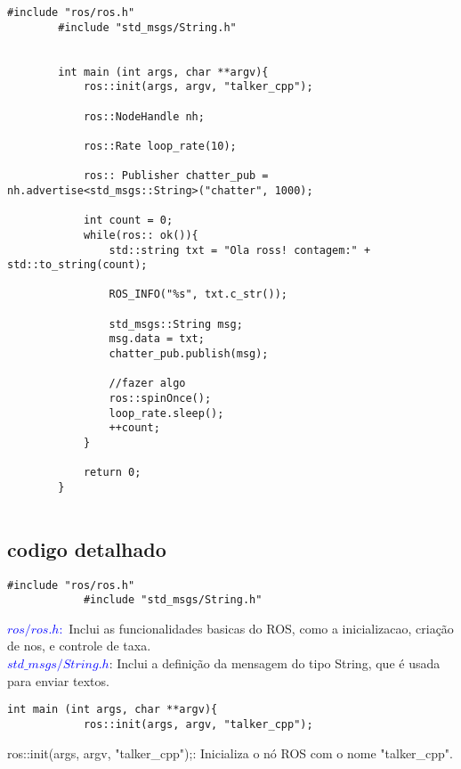 \documentclass[letterpaper]{article}
\begin{document}
    \begin{lstlisting}[style=cppStyle, title= talker\_cpp.cpp ] 
        #include "ros/ros.h"
        #include "std_msgs/String.h"
        
        
        int main (int args, char **argv){
            ros::init(args, argv, "talker_cpp");
        
            ros::NodeHandle nh;
        
            ros::Rate loop_rate(10);
        
            ros:: Publisher chatter_pub = nh.advertise<std_msgs::String>("chatter", 1000);
        
            int count = 0;
            while(ros:: ok()){
                std::string txt = "Ola ross! contagem:" + std::to_string(count);
        
                ROS_INFO("%s", txt.c_str());
        
                std_msgs::String msg;
                msg.data = txt;
                chatter_pub.publish(msg);
        
                //fazer algo
                ros::spinOnce();
                loop_rate.sleep();
                ++count;
            }
        
            return 0;
        }
        
    \end{lstlisting}
    \subsection{codigo detalhado}
        \begin{lstlisting}[style=cppStyle, title= headers ] 
            #include "ros/ros.h"
            #include "std_msgs/String.h"
        \end{lstlisting}
    
        \textcolor{blue}{$ros/ros.h:$} Inclui as funcionalidades basicas do ROS, como a inicializacao, criação de nos, e controle de taxa.\\
        \textcolor{blue}{$std\_msgs/String.h$}: Inclui a definição da mensagem do tipo String, que é usada para enviar textos.
        
        \begin{lstlisting}[style=cppStyle, title= Função main] 
            int main (int args, char **argv){
            ros::init(args, argv, "talker_cpp");
        \end{lstlisting}
        ros::init(args, argv, "talker\_cpp");: Inicializa o nó ROS com o nome "talker\_cpp".
        
\end{document}
